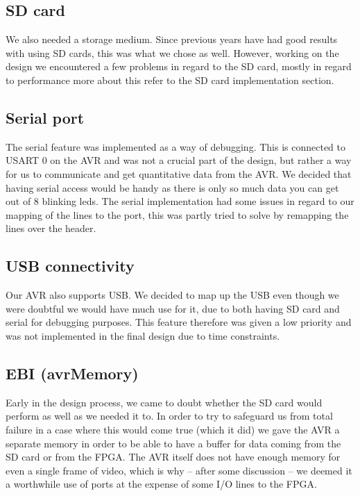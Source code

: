 \subsection{\ac{SD} card}

We also needed a storage medium. Since previous years have had good results with
using \ac{SD} cards, this was what we chose as well. However, working on the
design we encountered a few problems in regard to the \ac{SD} card, mostly in
regard to performance more about this refer to the \ac{SD} card implementation
section. 

\subsection{Serial port}

The serial feature was implemented as a way of debugging. This is connected to
\ac{USART} 0 on the AVR and was not a crucial part of the design, but rather a way for us to communicate and get quantitative data from the AVR. We decided that having serial access would be handy as there is only so much data you can get out of 8 blinking leds. The serial implementation had some issues in regard to our mapping of the lines to the port, this was partly tried to solve by remapping the lines over the header.

\subsection{\ac{USB} connectivity}

Our AVR also supports \ac{USB}. We decided to map up the \ac{USB} even though we were doubtful we would have much use for it, due to both having \ac{SD} card and serial for debugging purposes. This feature therefore was given a low priority and was not implemented in the final design due to time constraints.
 
\subsection{\ac{EBI} (avrMemory)}

Early in the design process, we came to doubt whether the \ac{SD} card would perform as well as we needed it to. In order to try to safeguard us from total failure in a case where this would come true (which it did) we gave the AVR a separate memory in order to be able to have a buffer for data coming from the \ac{SD} card or from the \ac{FPGA}. The AVR itself does not have enough memory for even a single frame of video, which is why -- after some discussion -- we deemed it a worthwhile use of ports at the expense of some \ac{I/O} lines to the FPGA.

